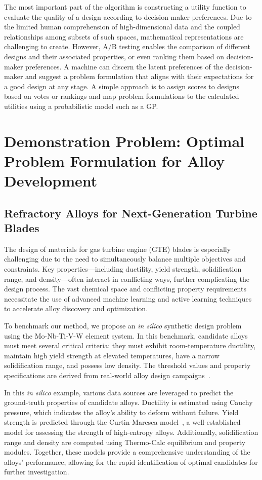\documentclass[final,5p,times,twocolumn]{elsarticle}
\begin{document}
The most important part of the algorithm is constructing a utility function to evaluate the quality of a design according to decision-maker preferences. Due to the limited human comprehension of high-dimensional data and the coupled relationships among subsets of such spaces, mathematical representations are challenging to create. However, A/B testing enables the comparison of different designs and their associated properties, or even ranking them based on decision-maker preferences. A machine can discern the latent preferences of the decision-maker and suggest a problem formulation that aligns with their expectations for a good design at any stage. A simple approach is to assign scores to designs based on votes or rankings and map problem formulations to the calculated utilities using a probabilistic model such as a GP.

\section{Demonstration Problem: Optimal Problem Formulation for Alloy Development}
\label{demonstration}

\subsection{Refractory Alloys for Next-Generation Turbine Blades}
The design of materials for gas turbine engine (GTE) blades is especially challenging due to the need to simultaneously balance multiple objectives and constraints. Key properties---including ductility, yield strength, solidification range, and density---often interact in conflicting ways, further complicating the design process. The vast chemical space and conflicting property requirements necessitate the use of advanced machine learning and active learning techniques to accelerate alloy discovery and optimization.

To benchmark our method, we propose an \emph{in silico} synthetic design problem using the Mo-Nb-Ti-V-W element system. In this benchmark, candidate alloys must meet several critical criteria: they must exhibit room-temperature ductility, maintain high yield strength at elevated temperatures, have a narrow solidification range, and possess low density. The threshold values and property specifications are derived from real-world alloy design campaigns~\cite{arpa-e_2020,acemi2024multi}.

In this \emph{in silico} example, various data sources are leveraged to predict the ground-truth properties of candidate alloys. Ductility is estimated using Cauchy pressure, which indicates the alloy's ability to deform without failure. Yield strength is predicted through the Curtin-Maresca model~\cite{MARESCA2020235}, a well-established model for assessing the strength of high-entropy alloys. Additionally, solidification range and density are computed using Thermo-Calc equilibrium and property modules. Together, these models provide a comprehensive understanding of the alloys' performance, allowing for the rapid identification of optimal candidates for further investigation.
\end{document}
